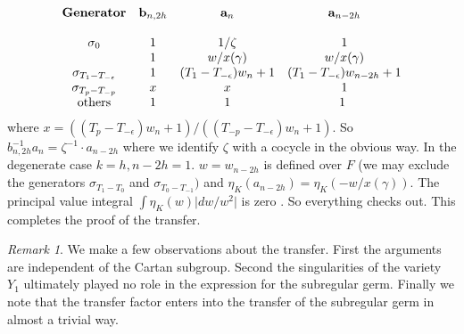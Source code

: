 \documentclass{memo-l}
\theoremstyle{definition}
\theoremstyle{remark}
\newtheorem*{remark*}{Remark} %
\numberwithin{section}{chapter}
\numberwithin{equation}{chapter}
\begin{document}
$$
\begin{matrix}
{\bold{Generator}} &  \bold{b}_{n,2h}  & \bold{a}_{n} & \bold{a}_{n-2h}	\\
\\
{\sigma}_{0} & 1 & 1/{\zeta} & 1 \\
& 1 &  w/x({\gamma})  & w/x({\gamma}) \\
{\sigma}_{T_{1}-T_{-{\epsilon}}} & 1 & (T_{1}-T_{-{\epsilon}})w_{n}+1  &
(T_{1}-T_{-{\epsilon}})w_{n-2h}+1  \\
{\sigma}_{T_{p}-T_{-p}} & x & x & 1 \\
{\text{others}} & 1 & 1 & 1 \
\end{matrix}
$$
where $x =
((T_{p}-T_{-{\epsilon}})w_{n}+1)/((T_{-p}-T_{-{\epsilon}})w_{n}+1)$.  So
$b_{n,2h}^{-1}a_{n}  =  {\zeta}^{-1} \cdot a_{n-2h}$ where we identify ${\zeta}$
with a cocycle in the obvious way.  In the degenerate case $k = h, n-2h = 1$.
$w = w_{n-2h}$ is defined over $F$ (we may exclude the generators
${\sigma}_{T_{1}-T_{0}}$ and ${\sigma}_{T_{0}-T_{-1}})$ and
${\eta}_{K}(a_{n-2h})  =  {\eta}_{K}(-w/x({\gamma}))$.  The principal value
integral $\int{\eta}_{K}(w)\vert dw/w^{2}\vert$ is zero \cite{MR748510}.  So
everything checks out.  This completes the proof of the transfer.

\medskip

\begin{remark*} We make a few observations about the transfer.
First the arguments are independent of the Cartan subgroup.  Second the
singularities of the variety $Y_{1}$ ultimately played no role in the
expression for the subregular germ.  Finally we note that the transfer
factor enters into the transfer of the subregular germ in almost a trivial
way.
\end{remark*}




\overfullrule=0pt

\appendix




\nocite{MR748504} %
\nocite{MR1266626} %
\nocite{MR1124110} %
\nocite{MR0340486} %
\nocite{MR480502} %
\nocite{MR0150130} %
\nocite{MR0180551} %
\end{document}

